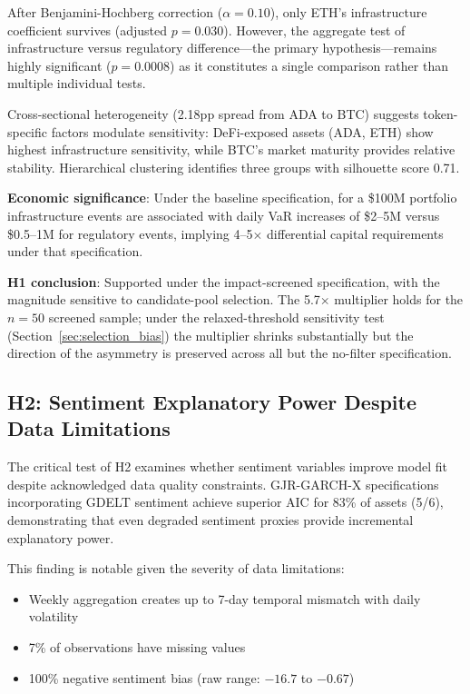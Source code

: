 \documentclass[pdflatex,sn-mathphys-num]{sn-jnl}
\theoremstyle{thmstyleone}
\theoremstyle{thmstyletwo}
\theoremstyle{thmstylethree}
\begin{document}
After Benjamini-Hochberg correction ($\alpha=0.10$), only ETH's infrastructure coefficient survives (adjusted $p=0.030$). However, the aggregate test of infrastructure versus regulatory difference---the primary hypothesis---remains highly significant ($p=0.0008$) as it constitutes a single comparison rather than multiple individual tests.

Cross-sectional heterogeneity (2.18pp spread from ADA to BTC) suggests token-specific factors modulate sensitivity: DeFi-exposed assets (ADA, ETH) show highest infrastructure sensitivity, while BTC's market maturity provides relative stability. Hierarchical clustering identifies three groups with silhouette score 0.71.

\textbf{Economic significance}: Under the baseline specification, for a \$100M portfolio infrastructure events are associated with daily VaR increases of \$2--5M versus \$0.5--1M for regulatory events, implying 4--5$\times$ differential capital requirements under that specification.

\textbf{H1 conclusion}: Supported under the impact-screened specification, with the magnitude sensitive to candidate-pool selection. The 5.7$\times$ multiplier holds for the $n=50$ screened sample; under the relaxed-threshold sensitivity test (Section~\ref{sec:selection_bias}) the multiplier shrinks substantially but the direction of the asymmetry is preserved across all but the no-filter specification.

\subsection{H2: Sentiment Explanatory Power Despite Data Limitations}

The critical test of H2 examines whether sentiment variables improve model fit despite acknowledged data quality constraints. GJR-GARCH-X specifications incorporating GDELT sentiment achieve superior AIC for 83\% of assets (5/6), demonstrating that even degraded sentiment proxies provide incremental explanatory power.

This finding is notable given the severity of data limitations:
\begin{itemize}[nosep]
\item Weekly aggregation creates up to 7-day temporal mismatch with daily volatility
\item 7\% of observations have missing values
\item 100\% negative sentiment bias (raw range: $-16.7$ to $-0.67$)
\end{itemize}
\end{document}
